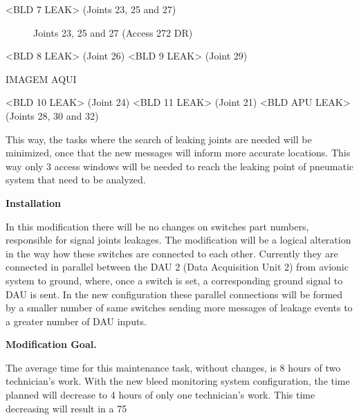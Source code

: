  <BLD 7 LEAK> (Joints 23, 25 and 27)



 \begin{figure}[H] %
\caption{Joints 23, 25 and 27 (Access 272 DR)}
\label{fig:joint23}
\end{figure}

 <BLD 8 LEAK> (Joint 26)
<BLD 9 LEAK> (Joint 29)



IMAGEM AQUI

<BLD 10 LEAK> (Joint 24)
<BLD 11 LEAK> (Joint 21)
<BLD APU LEAK> (Joints 28, 30 and 32)

This way, the tasks where the search of leaking joints are needed will be minimized, once that the new messages will inform more accurate locations. This way only 3 access windows will be needed to reach the leaking point of pneumatic system that need to be analyzed.

\textbf{Installation}

In this modification there will be no changes on switches part numbers, responsible for signal joints leakages. The modification will be a logical alteration in the way how these switches are connected to each other. Currently they are connected in parallel between the DAU 2 (Data Acquisition Unit 2) from avionic system to ground, where, once a switch is set, a corresponding ground signal to DAU is sent. In the new configuration these parallel connections will be formed by a smaller number of same switches sending more messages of leakage events to a greater number of DAU inputs.


\textbf{Modification Goal.}

The average time for this maintenance task, without changes, is 8 hours of two technician's work. With the new bleed monitoring system configuration, the time planned will decrease to 4 hours of only one technician's work. This time decreasing will result in a 75%





